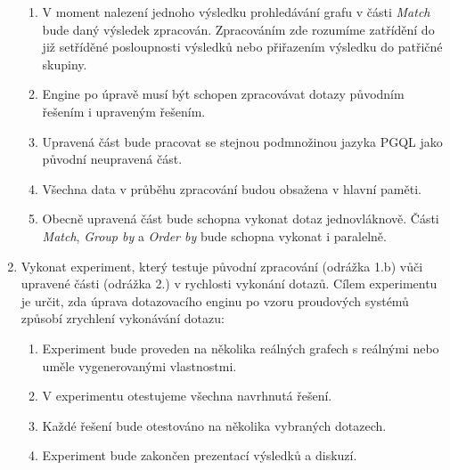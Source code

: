\begin{enumerate}
\begin{enumerate}
\item
V moment nalezení jednoho výsledku prohledávání grafu v části \textit{Match} bude daný výsledek zpracován.
Zpracováním zde rozumíme zatřídění do již setříděné posloupnosti výsledků nebo přiřazením výsledku do patřičné skupiny.

\item 
Engine po úpravě musí být schopen zpracovávat dotazy původním řešením i upraveným řešením.

\item
Upravená část bude pracovat se stejnou podmnožinou jazyka PGQL jako původní neupravená část.

\item
Všechna data v průběhu zpracování budou obsažena v hlavní paměti.

\item
Obecně upravená část bude schopna vykonat dotaz jednovláknově.
Části \textit{Match}, \textit{Group by} a \textit{Order by} bude schopna vykonat i paralelně.
\end{enumerate}

\item
Vykonat experiment, který testuje původní zpracování (odrážka 1.b) vůči upravené části (odrážka 2.) v rychlosti vykonání dotazů.
Cílem experimentu je určit, zda úprava dotazovacího enginu po vzoru proudových systémů způsobí zrychlení vykonávání dotazu:
\begin{enumerate}
\item Experiment bude proveden na několika reálných grafech s reálnými nebo uměle vygenerovanými vlastnostmi.
\item V experimentu otestujeme všechna navrhnutá řešení.
\item Každé řešení bude otestováno na několika vybraných dotazech.
\item Experiment bude zakončen prezentací výsledků a diskuzí.
\end{enumerate}
\end{enumerate}